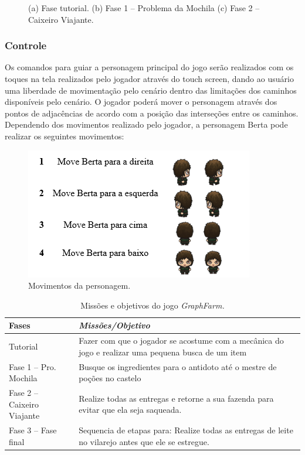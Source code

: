 \documentclass[10pt, conference, compsocconf]{IEEEtran}
\begin{document}
\begin{figure}[ht]
	\caption{(a) Fase tutorial. (b) Fase 1 – Problema da Mochila (c) Fase 2 – Caixeiro Viajante. } 
	\label{fig9}   
\end{figure}

\subsubsection{Controle} \label{GDD}
Os comandos para guiar a personagem principal do jogo serão realizados com os toques na tela realizados pelo jogador através do touch screen, dando ao usuário uma liberdade de movimentação pelo cenário dentro das limitações dos caminhos disponíveis pelo cenário. O jogador poderá mover o personagem através dos pontos de adjacências de acordo com a posição das interseções entre os caminhos.
Dependendo dos movimentos realizado pelo jogador, a personagem Berta pode realizar os seguintes movimentos:
\begin{figure}[htbp]
	\centering
	\includegraphics[width=.4\textwidth]{Figuras/controle.png}
	\caption{Movimentos da personagem.}\label{controlePersonagem}	
\end{figure}



	\begin{table}[!ht]
	\caption{Missões e objetivos do jogo \textit{GraphFarm.}}
	\begin{center}
		\begin{tabular}{|p{2.5cm}|p{4cm}|}
			\hline
			\textbf{Fases}&\textbf{\textit{Missões/Objetivo}} \\
			\hline
		Tutorial & 
			Fazer com que o jogador se acostume com a mecânica do jogo e realizar uma pequena busca de um item\\
			\hline
		Fase 1 – Pro. Mochila & Busque os ingredientes para o antidoto até o mestre de poções no castelo
		
			\\
			\hline
		Fase 2 – Caixeiro Viajante & 
			Realize todas as entregas e retorne a sua fazenda para evitar que ela seja saqueada.
			
			\\
			\hline
		Fase 3 – Fase final & 
			Sequencia de etapas para:
			Realize todas as entregas de leite no vilarejo antes que ele se estregue.
			
			\\
			\hline
		\end{tabular}
		\label{tab2}
	\end{center}
\end{table}
	
\end{document}
